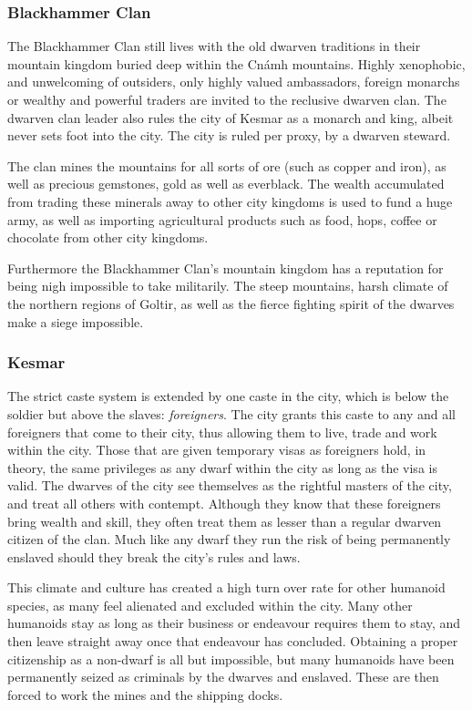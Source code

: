 \subsubsection*{Blackhammer Clan}

The Blackhammer Clan still lives with the old dwarven traditions in their
mountain kingdom buried deep within the Cnámh mountains. Highly xenophobic,
and unwelcoming of outsiders, only highly valued ambassadors, foreign monarchs
or wealthy and powerful traders are invited to the reclusive dwarven clan. The
dwarven clan leader also rules the city of Kesmar as a monarch and king,
albeit never sets foot into the city. The city is ruled per proxy, by a
dwarven steward.

The clan mines the mountains for all sorts of ore (such as copper and iron),
as well as precious gemstones, gold as well as everblack. The wealth
accumulated from trading these minerals away to other city kingdoms is used to
fund a huge army, as well as importing agricultural products such as food,
hops, coffee or chocolate from other city kingdoms.

Furthermore the Blackhammer Clan's mountain kingdom has a reputation for being
nigh impossible to take militarily. The steep mountains, harsh climate of the
northern regions of Goltir, as well as the fierce fighting spirit of the dwarves
make a siege impossible.

\subsubsection*{Kesmar}

The strict caste system is extended by one caste in the city, which is below
the soldier but above the slaves: \emph{foreigners}. The city grants this
caste to any and all foreigners that come to their city, thus allowing them to
live, trade and work within the city. Those that are given temporary visas as
foreigners hold, in theory, the same privileges as any dwarf within the city
as long as the visa is valid. The dwarves of the city see themselves as the
rightful masters of the city, and treat all others with contempt. Although
they know that these foreigners bring wealth and skill, they often treat them
as lesser than a regular dwarven citizen of the clan.  Much like any dwarf
they run the risk of being permanently enslaved should they break the city's
rules and laws.

This climate and culture has created a high turn over rate for other humanoid
species, as many feel alienated and excluded within the city. Many other
humanoids stay as long as their business or endeavour requires them to stay,
and then leave straight away once that endeavour has concluded. Obtaining a
proper citizenship as a non-dwarf is all but impossible, but many humanoids
have been permanently seized as criminals by the dwarves and enslaved. These
are then forced to work the mines and the shipping docks.

